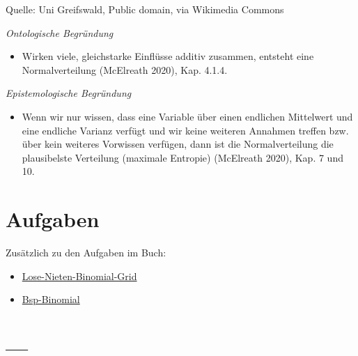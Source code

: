 \documentclass[
  a4paper,
  DIV=11]{scrreprt}
\providecommand{\tightlist}{%
  \setlength{\itemsep}{0pt}\setlength{\parskip}{0pt}}\usepackage{longtable,booktabs,array}
\theoremstyle{definition}
\theoremstyle{remark}
\begin{document}
Quelle: Uni Greifswald, Public domain, via Wikimedia Commons

\begin{tcolorbox}[enhanced jigsaw, title=\textcolor{quarto-callout-note-color}{\faInfo}\hspace{0.5em}{Hinweis}, bottomtitle=1mm, bottomrule=.15mm, titlerule=0mm, colbacktitle=quarto-callout-note-color!10!white, colframe=quarto-callout-note-color-frame, leftrule=.75mm, left=2mm, toprule=.15mm, colback=white, arc=.35mm, breakable, toptitle=1mm, opacityback=0, rightrule=.15mm, coltitle=black, opacitybacktitle=0.6]

\emph{Ontologische Begründung}

\begin{itemize}
\tightlist
\item
  Wirken viele, gleichstarke Einflüsse additiv zusammen, entsteht eine
  Normalverteilung (McElreath 2020), Kap. 4.1.4.
\end{itemize}

\emph{Epistemologische Begründung}

\begin{itemize}
\tightlist
\item
  Wenn wir nur wissen, dass eine Variable über einen endlichen
  Mittelwert und eine endliche Varianz verfügt und wir keine weiteren
  Annahmen treffen bzw. über kein weiteres Vorwissen verfügen, dann ist
  die Normalverteilung die plausibelste Verteilung (maximale Entropie)
  (McElreath 2020), Kap. 7 und 10.
\end{itemize}

\end{tcolorbox}

\hypertarget{aufgaben-2}{%
\section{Aufgaben}\label{aufgaben-2}}

Zusätzlich zu den Aufgaben im Buch:

\begin{itemize}
\tightlist
\item
  \href{https://datenwerk.netlify.app/posts/lose-nieten-binomial-grid/lose-nieten-binomial-grid}{Lose-Nieten-Binomial-Grid}
\item
  \href{https://datenwerk.netlify.app/posts/bsp-binomial/bsp-binomial}{Bsp-Binomial}
\end{itemize}

\hypertarget{section-3}{%
\section{---}\label{section-3}}
\end{document}

